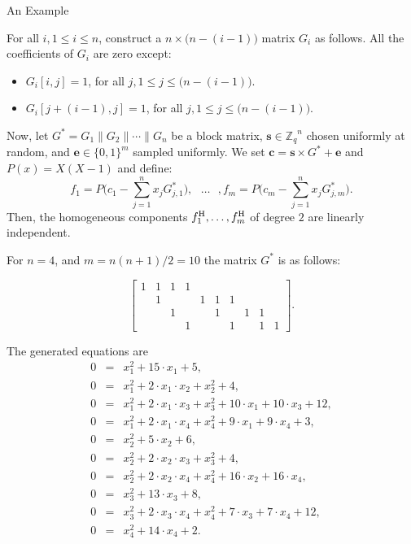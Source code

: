 \documentclass[10pt]{beamer}
\newcommand{\Zq}{\ensuremath{\mathbb{Z}_q}}
\newcommand{\svec}{\ensuremath{\mathbf{s}}\xspace}
\newcommand{\nbvar}{n}
\newcommand{\nbeq}{m}
\begin{document}
\begin{frame}[allowframebreaks]{An Example}
  
\begin{lemma}\label{ex1}
For all $i,1 \leq i \leq n$, construct a $n \times \big(n-(i-1)\big)$ matrix $G_i$ as follows. All the coefficients of $G_i$ are zero except: 
\begin{itemize}
\item $G_i[i,j]=1$, for all $j, 1\leq j \leq \big(n-(i-1)\big)$. 
\item  $G_i[j+(i-1),j]=1$, for all $j, 1 \leq j \leq \big( n-(i-1) \big)$.
\end{itemize}
Now, let $G^*=G_1 \| G_2 \| \cdots \| G_n$ be a block matrix, $\svec \in \Zq^n$ chosen uniformly at random, and $\mathbf{e} \in \{0,1\}^m$ sampled uniformly. 
We set $\mathbf{c} =\svec \times G^*+\mathbf{e}$ and $P(x) = X(X-1)$ and define:  
$$
f_1=P\big(c_1-\sum_{j=1}^{\nbvar}x_j G^*_{j,1}\big), \mbox{  } \ldots \mbox{  },f_{\nbeq}=P\big(c_{\nbeq}-\sum_{j=1}^{\nbvar}x_j G^*_{j,\nbeq}\big). 
$$  
Then, the homogeneous components $f^{{\rm H}}_1 ,\ldots,f^{{\rm H}}_{m}$ of degree $2$ are linearly independent.%
\end{lemma}

\framebreak

For $n=4$, and $m=n(n+1)/2=10$ the matrix $G^*$ is as follows:
\begin{center}
$$
\begin{bmatrix}
1 & 1 & 1 & 1 &   &   &   &   &   &  \\ 
  & 1 &   &   & 1 & 1 & 1 &   &   &  \\ 
  &   & 1 &   &   & 1 &   & 1 & 1 &  \\ 
  &   &   & 1 &   &   & 1 &   & 1 & 1
\end{bmatrix}.
$$
\end{center}

The generated equations are
{\small
\begin{eqnarray*} 
 0 &=& x_1^2 + 15\cdot x_1 + 5,\\
 0 &=& x_1^2 + 2\cdot x_1\cdot x_2 + x_2^2 + 4,\\
 0 &=& x_1^2 + 2\cdot x_1\cdot x_3 + x_3^2 + 10\cdot x_1 + 10\cdot x_3 + 12,\\
 0 &=& x_1^2 + 2\cdot x_1\cdot x_4 + x_4^2 + 9\cdot x_1 + 9\cdot x_4 + 3,\\
 0 &=& x_2^2 + 5\cdot x_2 + 6,\\
 0 &=& x_2^2 + 2\cdot x_2\cdot x_3 + x_3^2 + 4,\\
 0 &=& x_2^2 + 2\cdot x_2\cdot x_4 + x_4^2 + 16\cdot x_2 + 16\cdot x_4,\\
 0 &=& x_3^2 + 13\cdot x_3 + 8,\\
 0 &=& x_3^2 + 2\cdot x_3\cdot x_4 + x_4^2 + 7\cdot x_3 + 7\cdot x_4 + 12,\\
 0 &=& x_4^2 + 14\cdot x_4 + 2.
\end{eqnarray*}}


\end{frame}
\end{document}
